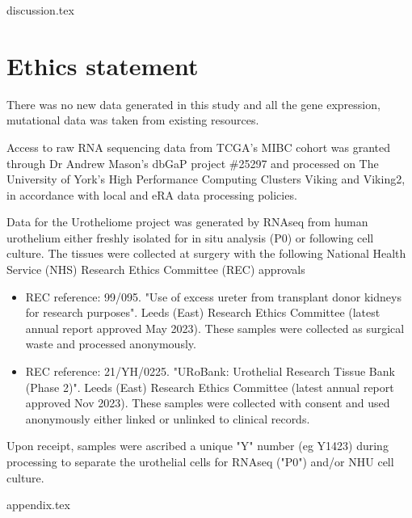 \documentclass[a4paper, 12pt]{report}
\begin{document}
{discussion.tex}


\chapter{Ethics statement}

There was no new data generated in this study and all the gene expression, mutational data was taken from existing resources.

Access to raw RNA sequencing data from TCGA's MIBC cohort was granted through Dr Andrew Mason's dbGaP project \#25297 and processed on The University of York's High Performance Computing Clusters Viking and Viking2, in accordance with local and eRA data processing policies.

Data for the Urotheliome project was generated by RNAseq from human urothelium either freshly isolated for in situ analysis (P0) or following cell culture. The tissues were collected at surgery with the following National Health Service (NHS) Research Ethics Committee (REC) approvals

\begin{itemize}
    \item REC reference: 99/095. "Use of excess ureter from transplant donor kidneys for research purposes". Leeds (East) Research Ethics Committee (latest annual report approved May 2023). These samples were collected as surgical waste and processed anonymously.
    \item REC reference: 21/YH/0225. "URoBank: Urothelial Research Tissue Bank (Phase 2)". Leeds (East) Research Ethics Committee (latest annual report approved Nov 2023). These samples were collected with consent and used anonymously either linked or unlinked to clinical records.  
\end{itemize}

Upon receipt, samples were ascribed a unique "Y" number (eg Y1423) during processing to separate the urothelial cells for RNAseq ("P0") and/or NHU cell culture.

{appendix.tex}







\end{document}
